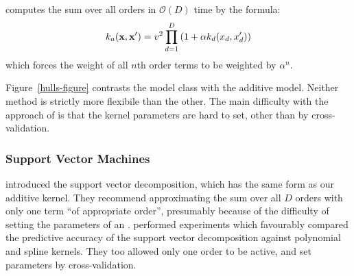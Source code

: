 \HKL{} computes the sum over all orders in $\mathcal{O}(D)$ time by the formula:
\begin{equation}
\label{eqn:uniform}
k_{a}({\bf x, x'}) = v^2 \prod_{d=1}^D \left(1 + \alpha k_{d}(x_{d}, x_{d}') \right)
\end{equation}
which forces the weight of all $n$th order terms to be weighted by $\alpha^n$.


Figure~\ref{hulls-figure} contrasts the \HKL{} model class with the additive \gp{} model.
Neither method is strictly more flexibile than the other.
The main difficulty with the approach of \citet{DBLP:journals/corr/abs-0909-0844} is that the kernel parameters are hard to set, other than by cross-validation.


\subsubsection{Support Vector Machines}

\citet{vapnik1998statistical} introduced the support vector \ANOVA{} decomposition, which has the same form as our additive kernel.
They recommend approximating the sum over all $D$ orders with only one term ``of appropriate order'', presumably because of the difficulty of setting the parameters of an \SVM{}.
\citet{stitson1999support} performed experiments which favourably compared the predictive accuracy of the support vector \ANOVA{} decomposition against polynomial and spline kernels.
They too allowed only one order to be active, and set parameters by cross-validation.
%

